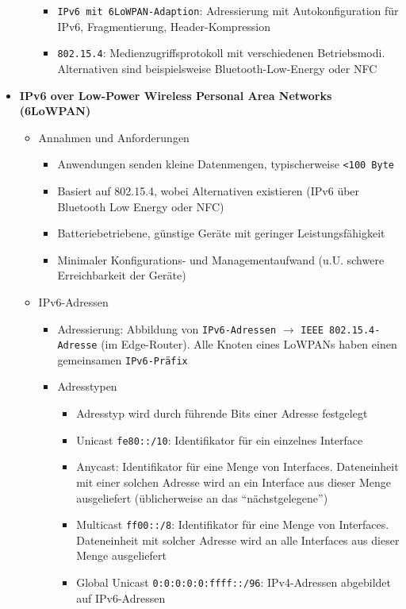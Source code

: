 \begin{itemize}
\begin{itemize}
\begin{itemize}
			\item \texttt{IPv6 mit 6LoWPAN-Adaption}: Adressierung mit Autokonfiguration für IPv6, Fragmentierung, Header-Kompression
			\item \texttt{802.15.4}: Medienzugriffsprotokoll mit verschiedenen Betriebsmodi. Alternativen sind beispielsweise Bluetooth-Low-Energy oder NFC
		\end{itemize}
	\end{itemize}
	\item \textbf{IPv6 over Low-Power Wireless Personal Area Networks (6LoWPAN)}
	\begin{itemize}
		\item Annahmen und Anforderungen
		\begin{itemize}
			\item Anwendungen senden kleine Datenmengen, typischerweise \texttt{<100 Byte}
			\item Basiert auf 802.15.4, wobei Alternativen existieren (IPv6 über Bluetooth Low Energy oder NFC)
			\item Batteriebetriebene, günstige Geräte mit geringer Leistungsfähigkeit
			\item Minimaler Konfigurations- und Managementaufwand (u.U. schwere Erreichbarkeit der Geräte)
		\end{itemize}
		\item IPv6-Adressen
		\begin{itemize}
			\item Adressierung: Abbildung von \texttt{IPv6-Adressen} \(\rightarrow\) \texttt{IEEE 802.15.4-Adresse} (im Edge-Router). Alle Knoten eines LoWPANs haben einen gemeinsamen \texttt{IPv6-Präfix}
			\item Adresstypen
			\begin{itemize}
				\item Adresstyp wird durch führende Bits einer Adresse festgelegt
				\item Unicast \texttt{fe80::/10}: Identifikator für ein einzelnes Interface
				\item Anycast: Identifikator für eine Menge von Interfaces. Dateneinheit mit einer solchen Adresse wird an ein Interface aus dieser Menge ausgeliefert (üblicherweise an das "`nächstgelegene"')
				\item Multicast \texttt{ff00::/8}: Identifikator für eine Menge von Interfaces. Dateneinheit mit solcher Adresse wird an alle Interfaces aus dieser Menge ausgeliefert
				\item Global Unicast \texttt{0:0:0:0:0:ffff::/96}: IPv4-Adressen abgebildet auf IPv6-Adressen

\end{itemize}
\end{itemize}
\end{itemize}
\end{itemize}

